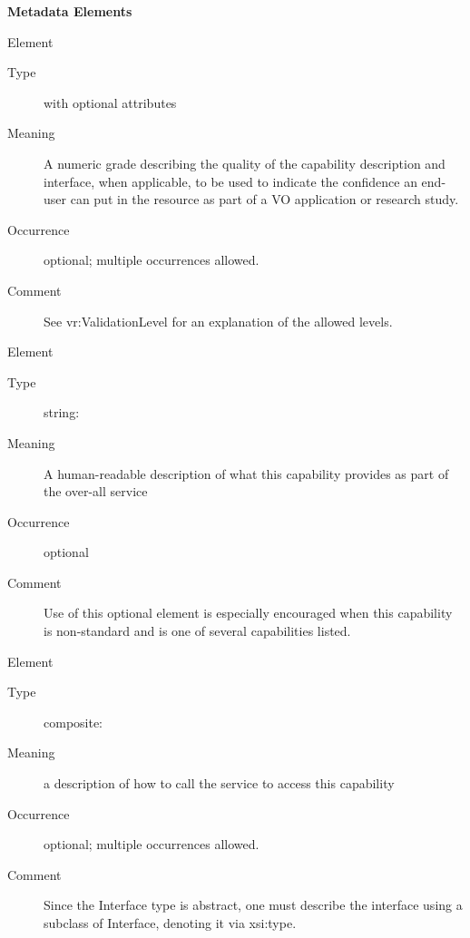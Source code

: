 \documentclass[11pt,a4paper]{ivoa}
\begin{document}
\begin{generated}
\vspace{0.5ex}\noindent\textbf{ Metadata Elements}

\begingroup\small\begin{bigdescription}\item[Element \xmlel{validationLevel}]
\begin{description}
\item[Type]  with optional attributes
\item[Meaning] 
                  A numeric grade describing the quality of the
                  capability description and interface, when applicable, 
                  to be used to indicate the confidence an end-user
                  can put in the resource as part of a VO application
                  or research study. 
               
\item[Occurrence] optional; multiple occurrences allowed.
\item[Comment] 
                  See vr:ValidationLevel for an explanation of the
                  allowed levels.  
               

\end{description}
\item[Element \xmlel{description}]
\begin{description}
\item[Type] string: 
\item[Meaning] 
                  A human-readable description of what this capability 
                  provides as part of the over-all service 
               
\item[Occurrence] optional
\item[Comment] 
                  Use of this optional element is especially encouraged when
                  this capability is non-standard and is one of several 
                  capabilities listed.
               

\end{description}
\item[Element \xmlel{interface}]
\begin{description}
\item[Type] composite: 
\item[Meaning] 
                  a description of how to call the service to access
                  this capability
               
\item[Occurrence] optional; multiple occurrences allowed.
\item[Comment] 
                  Since the Interface type is abstract, one must describe
                  the interface using a subclass of Interface, denoting
                  it via xsi:type.
               

\end{description}
\end{bigdescription}
\end{generated}
\end{document}
